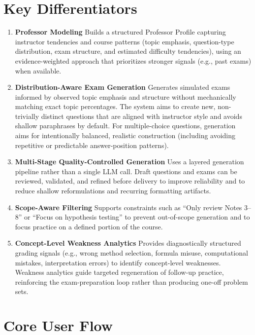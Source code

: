 \documentclass[11pt]{article}
\begin{document}
\section{Key Differentiators}
\begin{enumerate}
\item \textbf{Professor Modeling}
Builds a structured Professor Profile capturing instructor tendencies and course patterns (topic emphasis, question-type distribution, exam structure, and estimated difficulty tendencies), using an evidence-weighted approach that prioritizes stronger signals (e.g., past exams) when available.

\item \textbf{Distribution-Aware Exam Generation}
Generates simulated exams informed by observed topic emphasis and structure without mechanically matching exact topic percentages. The system aims to create new, non-trivially distinct questions that are aligned with instructor style and avoids shallow paraphrases by default. For multiple-choice questions, generation aims for intentionally balanced, realistic construction (including avoiding repetitive or predictable answer-position patterns).

\item \textbf{Multi-Stage Quality-Controlled Generation}
Uses a layered generation pipeline rather than a single LLM call. Draft questions and exams can be reviewed, validated, and refined before delivery to improve reliability and to reduce shallow reformulations and recurring formatting artifacts.

\item \textbf{Scope-Aware Filtering}
Supports constraints such as ``Only review Notes 3--8'' or ``Focus on hypothesis testing'' to prevent out-of-scope generation and to focus practice on a defined portion of the course.

\item \textbf{Concept-Level Weakness Analytics}
Provides diagnostically structured grading signals (e.g., wrong method selection, formula misuse, computational mistakes, interpretation errors) to identify concept-level weaknesses. Weakness analytics guide targeted regeneration of follow-up practice, reinforcing the exam-preparation loop rather than producing one-off problem sets.
\end{enumerate}

\section{Core User Flow}
\end{document}
